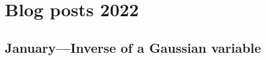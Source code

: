 \documentclass{article}
\begin{document}







 \section{Blog posts 2022}

\subsection{January---Inverse of a Gaussian variable}
\end{document}
